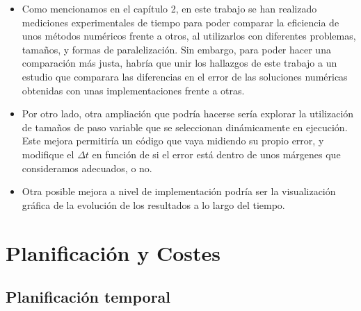 \begin{itemize}
	\item Como mencionamos en el capítulo 2, en este trabajo se han realizado mediciones experimentales de tiempo para poder comparar la eficiencia de unos métodos numéricos frente a otros, al utilizarlos con diferentes problemas, tamaños, y formas de paralelización. Sin embargo, para poder hacer una comparación más justa, habría que unir los hallazgos de este trabajo a un estudio que comparara las diferencias en el error de las soluciones numéricas obtenidas con unas implementaciones frente a otras.
	
	\item Por otro lado, otra ampliación que podría hacerse sería explorar la utilización de tamaños de paso variable que se seleccionan dinámicamente en ejecución. Este mejora permitiría un código que vaya midiendo su propio error, y modifique el $\Delta t$ en función de si el error está dentro de unos márgenes que consideramos adecuados, o no. 
	
	\item Otra posible mejora a nivel de implementación podría ser la visualización gráfica de la evolución de los resultados a lo largo del tiempo.
\end{itemize}

\chapter{Planificación y Costes}

\section{Planificación temporal}

